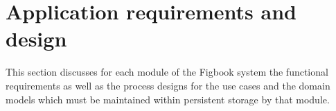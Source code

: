 \documentclass[12pt]{article}
\begin{document}
\section{Application requirements and design}
\par{This section discusses for each module of the Figbook system the functional requirements
as well as the process designs for the use cases and the domain models which must be maintained
within persistent storage by that module.
}


\newpage


\newpage


\newpage
\end{document}
